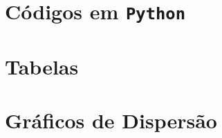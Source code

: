 \documentclass[12pt,twoside,a4paper]{book}
\renewcommand{\chaptermark}[1]{\markboth{\MakeUppercase{#1}}{}}
\begin{document}

\renewcommand{\chaptermark}[1]{\markboth{\MakeUppercase{\appendixname\ \thechapter}} {\MakeUppercase{#1}} }
\fancyhead[RE,LO]{}
\appendix

\chapter{Códigos em \tt{Python}}
\label{ape:codigos}













\chapter{Tabelas}
\label{ape:tabelas}



\chapter{Gráficos de Dispersão}
\label{ape:graficos_dispersao}


\backmatter \singlespacing   %
\end{document}
